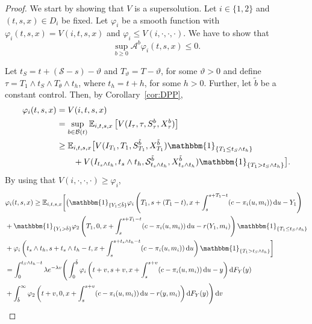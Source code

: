 \documentclass[a4paper]{scrartcl}
\theoremstyle{remark}
\theoremstyle{definition}
\numberwithin{equation}{section}
\newcommand*\diff{\mathop{}\!\mathrm{d}}
\newcommand{\ind}{\mathbbm{1}_}
\begin{document}
\begin{proof}

We start by showing that $V$ is a supersolution. Let $i \in \{1,2\}$ and $(t,s,x) \in D_i$ be fixed. Let $\varphi_i$ be a smooth function with $\varphi_i(t,s,x)=V(i,t,s,x)$ and $\varphi_i\leq V(i,\cdot,\cdot,\cdot)$. We have to show that 
\begin{equation*}
    \sup_{b\geq 0} \mathcal{A}^b \varphi_i(t,s,x)\leq 0.
\end{equation*}

Let $t_S=t+(\mathcal{S}-s)-\vartheta$ and $T_\vartheta=T-\vartheta$, for some $\vartheta>0$ and define $\tau=T_1 \wedge t_S \wedge T_\theta \wedge t_h$, where $t_h=t+h$, for some $h>0$. Further, let $\tilde{b}$ be a constant control. Then, by Corollary~\ref{cor:DPP},
\begin{align*}
    \varphi_i(t,s,x)    &=V(i,t,s,x)\\
                        &=\sup_{b \in \mathcal{B}(t)} \mathbb{E}_{i,t,s,x}\left[V(I_\tau,\tau,S_\tau^b,X_\tau^b)   \right]\\
                        &\geq \mathbb{E}_{i,t,s,x}\big[V(I_{T_1},T_1,S_{T_1}^{\tilde{b}},X_{T_1}^{\tilde{b}})\ind{\{T_1\leq t_S\wedge t_h\}} \\
                        & \qquad + V(I_{t_s \wedge t_h},t_s \wedge t_h,\mathcal{S}^{\tilde{b}}_{t_s \wedge t_h},X^{\tilde{b}}_{t_s \wedge t_h})\ind{\{T_1 > t_S\wedge t_h\}} \big].
\end{align*}
By using that $V(i,\cdot,\cdot,\cdot)\geq \varphi_i$,
\begin{align*}
     &\varphi_i(t,s,x)  \geq \mathbb{E}_{i,t,s,x}\bigg[\big( \ind {\{Y_1 \leq \tilde{b} \}}\varphi_i\left(T_1,s+(T_1-t),x+\int_{s}^{s+T_1-t}(c-\pi_i(u,m_i))\diff u-Y_1\right) \\
     & + \ind {\{Y_1 > \tilde{b} \}} \varphi_2\left(T_1,0,x+\int_{s}^{s+T_1-t}(c-\pi_i(u,m_i))\diff u-r(Y_1,m_i)    \right) \ind{\{T_1\leq t_S\wedge t_h\}} \\
                        & + \varphi_i\left(t_s \wedge t_h,s+t_s \wedge t_h-t,x+\int_{s}^{s+t_s \wedge t_h-t}(c-\pi_i(u,m_i))\diff u\right)\ind{\{T_1 > t_S\wedge t_h\}} \bigg]\\
     &= \int_{0}^{t_S\wedge t_h-t} \lambda e^{-\lambda v} \Bigg(\int_0^{\tilde{b}} \varphi_i\left(t+v,s+v,x+\int_{s}^{s+v}(c-\pi_i(u,m_i))\diff u-y  \right)\diff F_Y(y) \\
     &+ \int_{\tilde{b}}^\infty \varphi_2\left(t+v,0,x+\int_{s}^{s+v}(c-\pi_i(u,m_i))\diff u-r(y,m_i)  \right)\diff F_Y(y)\Bigg) \diff v  \\ 

\end{align*}
\end{proof}
\end{document}
